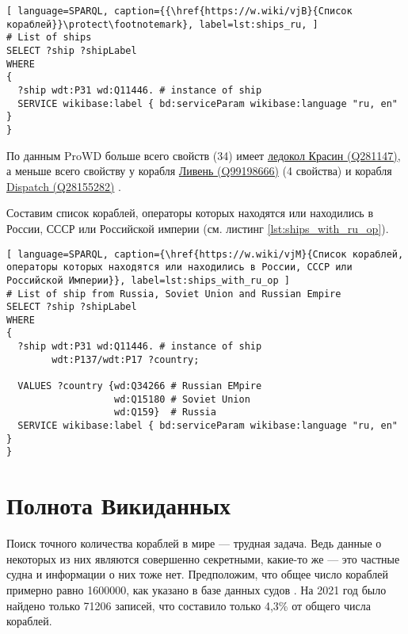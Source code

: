 \begin{lstlisting}[ language=SPARQL, caption={{\href{https://w.wiki/vjB}{Список кораблей}}\protect\footnotemark}, label=lst:ships_ru, ]
# List of ships
SELECT ?ship ?shipLabel
WHERE
{
  ?ship wdt:P31 wd:Q11446. # instance of ship
  SERVICE wikibase:label { bd:serviceParam wikibase:language "ru, en" }
}
\end{lstlisting}

По данным ProWD больше всего свойств (34) имеет \href{https://www.wikidata.org/wiki/Q281147}{ледокол Красин (Q281147)}, а меньше всего свойству у корабля \href{https://www.wikidata.org/wiki/Q99198666}{Ливень (Q99198666)} (4 свойства) и корабля \href{https://www.wikidata.org/wiki/Q28155282}{Dispatch (Q28155282)} \cite{ProWD_ru_ships}.

Составим список кораблей, операторы которых находятся или находились в России, СССР или Российской империи (см. листинг \ref{lst:ships_with_ru_op}).

\begin{lstlisting}[ language=SPARQL, caption={\href{https://w.wiki/vjM}{Cписок кораблей, операторы которых находятся или находились в России, СССР или Российской Империи}}, label=lst:ships_with_ru_op ]
# List of ship from Russia, Soviet Union and Russian Empire
SELECT ?ship ?shipLabel
WHERE
{
  ?ship wdt:P31 wd:Q11446. # instance of ship
        wdt:P137/wdt:P17 ?country; 
    
  VALUES ?country {wd:Q34266 # Russian EMpire
                   wd:Q15180 # Soviet Union
                   wd:Q159}  # Russia
  SERVICE wikibase:label { bd:serviceParam wikibase:language "ru, en" }
}
\end{lstlisting}


\section{Полнота Викиданных}

\label{question:ship_1}

Поиск точного количества кораблей в мире — трудная задача. Ведь данные о некоторых из них являются совершенно секретными, какие-то же — это частные судна и информации о них тоже нет. Предположим, что общее число кораблей примерно равно \num{1600000}, как указано в базе данных судов \cite{FleetMon}. На 2021 год было найдено только \num{71206} записей, что составило только 4,3\% от общего числа кораблей.


